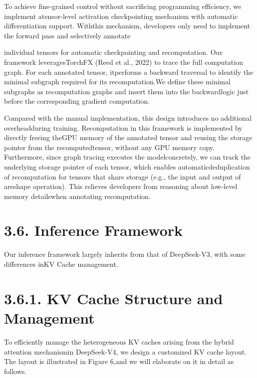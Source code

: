 \documentclass[
  10
]{article}
\begin{document}
To achieve fine-grained control without sacrificing programming
efficiency, we implement atensor-level activation checkpointing
mechanism with automatic differentiation support. Withthis mechanism,
developers only need to implement the forward pass and selectively
annotate

individual tensors for automatic checkpointing and recomputation. Our
framework leveragesTorchFX (Reed et al., 2022) to trace the full
computation graph. For each annotated tensor, itperforms a backward
traversal to identify the minimal subgraph required for its
recomputation.We define these minimal subgraphs as recomputation graphs
and insert them into the backwardlogic just before the corresponding
gradient computation.

Compared with the manual implementation, this design introduces no
additional overheadduring training. Recomputation in this framework is
implemented by directly freeing theGPU memory of the annotated tensor
and reusing the storage pointer from the recomputedtensor, without any
GPU memory copy. Furthermore, since graph tracing executes the
modelconcretely, we can track the underlying storage pointer of each
tensor, which enables automaticdeduplication of recomputation for
tensors that share storage (e.g., the input and output of areshape
operation). This relieves developers from reasoning about low-level
memory detailswhen annotating recomputation.

\section{3.6. Inference Framework}\label{inference-framework}

Our inference framework largely inherits from that of DeepSeek-V3, with
some differences inKV Cache management.

\section{3.6.1. KV Cache Structure and
Management}\label{kv-cache-structure-and-management}

To efficiently manage the heterogeneous KV caches arising from the
hybrid attention mechanismin DeepSeek-V4, we design a customized KV
cache layout. The layout is illustrated in Figure 6,and we will
elaborate on it in detail as follows.
\end{document}
